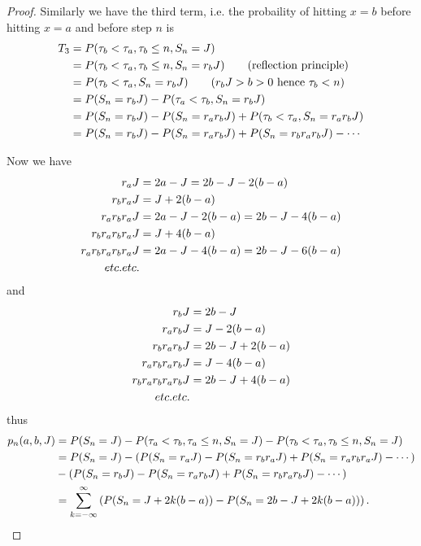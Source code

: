 \begin{proof}
Similarly we have the third term, i.e. the probaility of hitting $x=b$ before
hitting $x=a$ and before step $n$ is
\begin{align*}
  T_3 &= P(\tau_b<\tau_a, \tau_b\le n, S_n=J)  \notag \\
      &= P(\tau_b<\tau_a, \tau_b\le n, S_n=r_b J) 
           \qquad \text{(reflection principle)} \notag \\
      &= P(\tau_b<\tau_a, S_n=r_b J)  
           \qquad \text{($r_b J>b>0$ hence $\tau_b<n$)}  \notag \\
      &= P(S_n=r_b J) - P(\tau_a<\tau_b, S_n=r_b J)  \notag \\
      &= P(S_n=r_b J) - P(S_n=r_a r_b J)+ P(\tau_b<\tau_a, S_n=r_a r_b J) 
         \notag \\
      &= P(S_n=r_b J) - P(S_n=r_a r_b J)+ P(S_n=r_b r_a r_b J) - \cdots  
\end{align*}

Now we have
\begin{align*}
  r_a J &= 2a - J = 2b - J - 2(b-a)    \notag \\
  r_b r_a J &= J + 2(b-a)   \notag \\
  r_a r_b r_a J &= 2a - J - 2(b-a) = 2b - J - 4(b-a)  \notag \\
  r_b r_a r_b r_a J &= J + 4(b-a)   \notag \\
  r_a r_b r_a r_b r_a J &= 2a - J - 4(b-a) = 2b - J - 6(b-a)  \notag \\
  etc.etc.
\end{align*}
and
\begin{align*}
  r_b J &= 2b - J     \notag \\
  r_a r_b J &= J - 2(b-a)   \notag \\
  r_b r_a r_b J &= 2b - J + 2(b-a)  \notag \\
  r_a r_b r_a r_b J &= J - 4(b-a)   \notag \\
  r_b r_a r_b r_a r_b J &= 2b - J + 4(b-a)   \notag \\
  etc.etc.
\end{align*}
thus 
\begin{align*}
  p_n(a,b,J) 
    &= P(S_n=J) - P(\tau_a<\tau_b, \tau_a\le n, S_n=J)
                - P(\tau_b<\tau_a, \tau_b\le n, S_n=J) \notag \\
    &= P(S_n=J)  
       - ( P(S_n=r_a J) - P(S_n=r_b r_a J)+ P(S_n=r_a r_b r_a J) - \cdots ) 
       \notag \\ 
    &- ( P(S_n=r_b J) - P(S_n=r_a r_b J)+ P(S_n=r_b r_a r_b J) - \cdots ) 
       \notag \\ 
    &= \sum_{k=-\infty}^{\infty}
       \left( P(S_n=J+2k(b-a)) - P(S_n=2b-J+2k(b-a)) \right).
\end{align*}

\end{proof}


